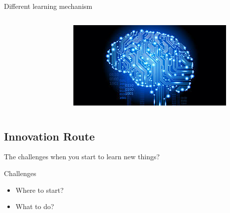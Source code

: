 \documentclass[12pt]{beamer}
\begin{document}
\begin{frame}{Different learning mechanism}
\begin{columns}
{\begin{figure}
        \end{figure}
        \begin{figure}
        \includegraphics[scale=0.3]{Figures/Compute.jpg}
        \end{figure}}
\end{columns}
\end{frame}
\subsection{Innovation Route}
\begin{frame}{The challenges when you start to learn new things?}

\begin{block}{Challenges}

\begin{itemize}
\item<1-> Where to start?
\item<2-> What to do?
\end{itemize}
\end{block}
\end{frame}
\end{document}
